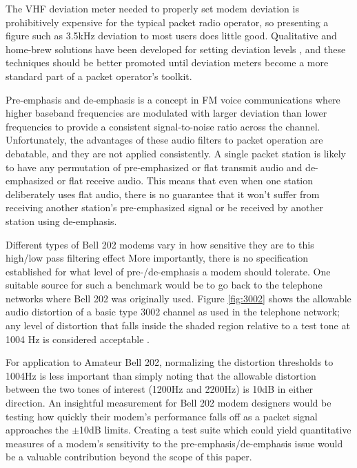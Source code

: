 The VHF deviation meter needed to properly set modem deviation is prohibitively
expensive for the typical packet radio operator, so presenting a figure 
such as 3.5kHz deviation to most users does little good.
Qualitative and home-brew solutions have been developed
for setting deviation levels \cite{n8urdev},
and these techniques should be better promoted until 
deviation meters become a more standard part of a packet operator's toolkit. 

Pre-emphasis and de-emphasis is a concept in FM voice communications where
higher baseband frequencies are modulated with larger deviation 
than lower frequencies
to provide a consistent signal-to-noise ratio across the channel.
Unfortunately, the advantages of these audio filters to packet operation 
are debatable, and they are not applied consistently. A single packet 
station is likely to have any permutation of pre-emphasized or flat 
transmit audio and de-emphasized or flat receive audio.
This means that even when one station deliberately uses flat audio,
there is no guarantee that it won't suffer from receiving another
station's pre-emphasized signal or be received by another station using de-emphasis.

Different types of Bell 202 modems vary in how sensitive they are to this high/low
pass filtering effect More importantly, there is no specification established
for what level of pre-/de-emphasis a modem should tolerate.
One suitable source for such a benchmark would be to go back to the
telephone networks where Bell 202 was originally used.
Figure \ref{fig:3002} shows the allowable audio distortion of a basic type 3002
channel as used in the telephone network; any level of distortion that falls 
inside the shaded region relative to a test tone at 1004 Hz is considered 
acceptable \cite{alisouskas}.

For application to Amateur Bell 202, 
normalizing the distortion thresholds to 1004Hz is 
less important than simply noting that the allowable distortion between the two
tones of interest (1200Hz and 2200Hz) is 10dB in either direction.
An insightful measurement for Bell 202 modem designers would be testing how
quickly their modem's performance falls off as a packet signal approaches 
the $\pm$10dB limits.
Creating a test suite which could yield quantitative
measures of a modem's sensitivity to the pre-emphasis/de-emphasis issue would
be a valuable contribution beyond the scope of this paper.

